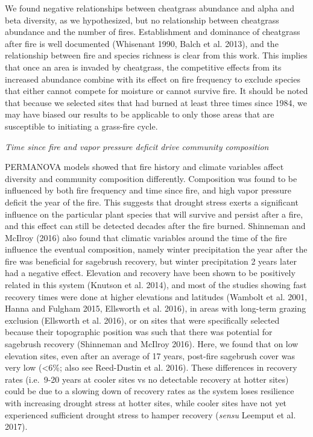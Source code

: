 \documentclass[12pt,]{article}
\begin{document}
We found negative relationships between cheatgrass abundance and alpha
and beta diversity, as we hypothesized, but no relationship between
cheatgrass abundance and the number of fires. Establishment and
dominance of cheatgrass after fire is well documented (Whisenant 1990,
Balch et al. 2013), and the relationship between fire and species
richness is clear from this work. This implies that once an area is
invaded by cheatgrass, the competitive effects from its increased
abundance combine with its effect on fire frequency to exclude species
that either cannot compete for moisture or cannot survive fire. It
should be noted that because we selected sites that had burned at least
three times since 1984, we may have biased our results to be applicable
to only those areas that are susceptible to initiating a grass-fire
cycle.

\emph{Time since fire and vapor pressure deficit drive community
composition}

PERMANOVA models showed that fire history and climate variables affect
diversity and community composition differently. Composition was found
to be influenced by both fire frequency and time since fire, and high
vapor pressure deficit the year of the fire. This suggests that drought
stress exerts a significant influence on the particular plant species
that will survive and persist after a fire, and this effect can still be
detected decades after the fire burned. Shinneman and McIlroy (2016)
also found that climatic variables around the time of the fire influence
the eventual composition, namely winter precipitation the year after the
fire was beneficial for sagebrush recovery, but winter precipitation 2
years later had a negative effect. Elevation and recovery have been
shown to be positively related in this system (Knutson et al. 2014), and
most of the studies showing fast recovery times were done at higher
elevations and latitudes (Wambolt et al. 2001, Hanna and Fulgham 2015,
Ellsworth et al. 2016), in areas with long-term grazing exclusion
(Ellsworth et al. 2016), or on sites that were specifically selected
because their topographic position was such that there was potential for
sagebrush recovery (Shinneman and McIlroy 2016). Here, we found that on
low elevation sites, even after an average of 17 years, post-fire
sagebrush cover was very low (\textless{}6\%; also see Reed-Dustin et
al. 2016). These differences in recovery rates (i.e.~9-20 years at
cooler sites vs no detectable recovery at hotter sites) could be due to
a slowing down of recovery rates as the system loses resilience with
increasing drought stress at hotter sites, while cooler sites have not
yet experienced sufficient drought stress to hamper recovery
(\emph{sensu} Leemput et al. 2017).
\end{document}
